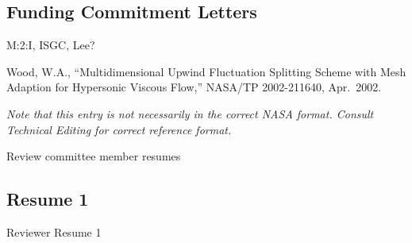 \documentclass[]            %
{CSLI}                       %
\begin{document}
\subsection{Funding Commitment Letters}
M:2:I, ISGC, Lee?

\newpage
\begin{thebibliography}{WoodTP}
 Wood, W.A., ``Multidimensional Upwind
  Fluctuation Splitting Scheme with Mesh Adaption for Hypersonic Viscous
  Flow,'' NASA/TP 2002-211640, Apr.~2002.
\end{thebibliography}
{\em Note that this entry is not necessarily in the correct NASA
  format. Consult Technical Editing for correct reference format.}

\newpage
\appendix




\newpage




\newpage

Review committee member resumes

\subsection{Resume 1}
Reviewer Resume 1
\end{document}
